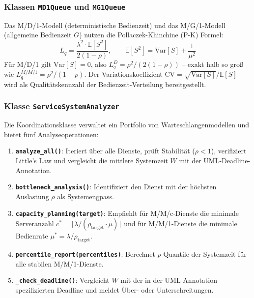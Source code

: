 ﻿\documentclass[a4paper,12pt]{scrreprt}
\theoremstyle{definition}
\begin{document}
\subsubsection{Klassen \texttt{MD1Queue} und \texttt{MG1Queue}}

Das M/D/1-Modell (deterministische Bedienzeit) und das M/G/1-Modell
(allgemeine Bedienzeit $G$) nutzen die Pollaczek-Khinchine (P-K) Formel:
\begin{equation}
	L_q = \frac{\lambda^2 \cdot \mathbb{E}[S^2]}{2(1-\rho)}, \qquad
	\mathbb{E}[S^2] = \mathrm{Var}[S] + \frac{1}{\mu^2}
\end{equation}
Für M/D/1 gilt $\mathrm{Var}[S]=0$, also $L_q^{D} = \rho^2/(2(1-\rho))$
-- exakt halb so groß wie $L_q^{M/M/1} = \rho^2/(1-\rho)$.
Der Variationskoeffizient $\mathrm{CV} = \sqrt{\mathrm{Var}[S]} / \mathbb{E}[S]$
wird als Qualitätskennzahl der Bedienzeit-Verteilung bereitgestellt.

\subsubsection{Klasse \texttt{ServiceSystemAnalyzer}}

Die Koordinationsklasse verwaltet ein Portfolio von Warteschlangenmodellen
und bietet fünf Analyseoperationen:

\begin{enumerate}
	\item[-] \textbf{\texttt{analyze\_all()}}: Iteriert über alle Dienste,
	prüft Stabilität ($\rho < 1$), verifiziert Little's Law und
	vergleicht die mittlere Systemzeit $W$ mit der UML-Deadline-Annotation.
	\item[-] \textbf{\texttt{bottleneck\_analysis()}}: Identifiziert den
	Dienst mit der höchsten Auslastung $\rho$ als Systemengpass.
	\item[-] \textbf{\texttt{capacity\_planning(target)}}:
	Empfiehlt für M/M/c-Dienste die minimale Serveranzahl
	$c^* = \lceil \lambda / (\rho_\text{target} \cdot \mu) \rceil$
	und für M/M/1-Dienste die minimale Bedienrate
	$\mu^* = \lambda / \rho_\text{target}$.
	\item[-] \textbf{\texttt{percentile\_report(percentiles)}}:
	Berechnet $p$-Quantile der Systemzeit für alle stabilen M/M/1-Dienste.
	\item[-] \textbf{\texttt{\_check\_deadline()}}: Vergleicht $W$ mit der
	in der UML-Annotation spezifizierten Deadline und meldet Über- oder
	Unterschreitungen.
\end{enumerate}
\end{document}
